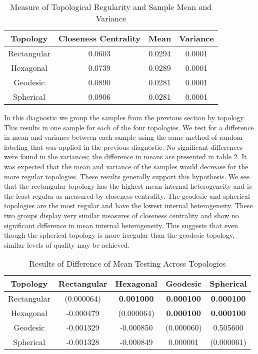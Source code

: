 \begin{table}
\centering
\begin{minipage}{\textwidth}
\caption{Measure of Topological Regularity and Sample Mean and Variance}
\label{vardeg}
\begin{tabular}{|c||c|c|c|}
\hline
Topology & Closeness Centrality & Mean & Variance\\
\hline
Rectangular & 0.0603 & 0.0294 &0.0001\\
Hexagonal & 0.0739 & 0.0289 &0.0001\\
Geodesic & 0.0890 & 0.0281 &0.0001\\
Spherical & 0.0906 & 0.0281 &0.0001\\
\hline
\end{tabular}
\end{minipage}
\end{table}

In this diagnostic we group the samples from the previous section by topology.
This results in one sample for each of the four topologies.  We test for a
difference in mean and variance between each sample using the same method of
random labeling that was applied in the previous diagnostic.  No significant
differences were found in the variances; the difference in means are presented
in table \ref{rlt:all}.  It was expected that the mean and variance of the
samples would decrease for the more regular topologies.  These results
generally support this hypothesis. We see that the rectangular topology has
the highest mean internal heterogeneity and is the least regular as measured by
closeness centrality. The geodesic and spherical topologies are the most
regular and have the lowest internal heterogeneity. These two groups display very
similar measures of closeness centrality and show no significant difference in
mean internal heterogeneity.  This suggests that even though the spherical topology
is more irregular than the geodesic topology, similar levels of quality may be
achieved.


\begin{table}
  \begin{minipage}{\textwidth}
  \caption{Results of Difference of Mean Testing Across Topologies}
  \label{rlt:all}
  \begin{tabular}{|c||c|c|c|c|}
  \hline
  \textbf{Topology}&Rectangular	&Hexagonal &Geodesic &Spherical\\\hline
  \hline
   Rectangular & (0.000064) & \textbf{0.001000} & \textbf{0.000100} & \textbf{0.000100}\\\hline
   Hexagonal & -0.000479 & (0.000064) & \textbf{0.000100} & \textbf{0.000100}\\\hline
   Geodesic & -0.001329 & -0.000850 & (0.000060) & 0.505600\\\hline
   Spherical & -0.001328 & -0.000849 & 0.000001 & (0.000061)\\\hline

  \end{tabular}
  \end{minipage}
\end{table}



